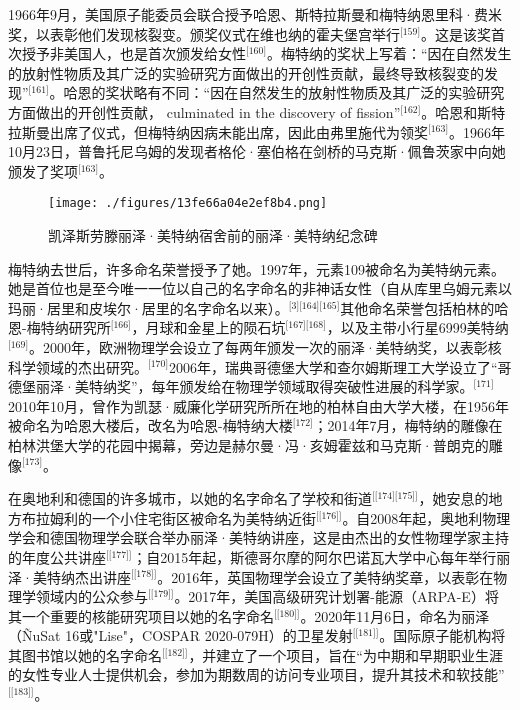 1966年9月，美国原子能委员会联合授予哈恩、斯特拉斯曼和梅特纳恩里科·费米奖，以表彰他们发现核裂变。颁奖仪式在维也纳的霍夫堡宫举行\(^\text{[159]}\)。这是该奖首次授予非美国人，也是首次颁发给女性\(^\text{[160]}\)。梅特纳的奖状上写着：“因在自然发生的放射性物质及其广泛的实验研究方面做出的开创性贡献，最终导致核裂变的发现”\(^\text{[161]}\)。哈恩的奖状略有不同：“因在自然发生的放射性物质及其广泛的实验研究方面做出的开创性贡献， culminated in the discovery of fission”\(^\text{[162]}\)。哈恩和斯特拉斯曼出席了仪式，但梅特纳因病未能出席，因此由弗里施代为领奖\(^\text{[163]}\)。1966年10月23日，普鲁托尼乌姆的发现者格伦·塞伯格在剑桥的马克斯·佩鲁茨家中向她颁发了奖项\(^\text{[163]}\)。
\begin{figure}[ht]
\centering
\texttt{[image: ./figures/13fe66a04e2ef8b4.png]}
\caption{凯泽斯劳滕丽泽·美特纳宿舍前的丽泽·美特纳纪念碑} \label{fig_LZm_17}
\end{figure}
梅特纳去世后，许多命名荣誉授予了她。1997年，元素109被命名为美特纳元素。她是首位也是至今唯一一位以自己的名字命名的非神话女性（自从库里乌姆元素以玛丽·居里和皮埃尔·居里的名字命名以来）。\(^\text{[3][164][165]}\)其他命名荣誉包括柏林的哈恩-梅特纳研究所\(^\text{[166]}\)，月球和金星上的陨石坑\(^\text{[167][168]}\)，以及主带小行星6999美特纳\(^\text{[169]}\)。2000年，欧洲物理学会设立了每两年颁发一次的丽泽·美特纳奖，以表彰核科学领域的杰出研究。\(^\text{[170]}\)2006年，瑞典哥德堡大学和查尔姆斯理工大学设立了“哥德堡丽泽·美特纳奖”，每年颁发给在物理学领域取得突破性进展的科学家。\(^\text{[171]}\)2010年10月，曾作为凯瑟·威廉化学研究所所在地的柏林自由大学大楼，在1956年被命名为哈恩大楼后，改名为哈恩-梅特纳大楼\(^\text{[172]}\)；2014年7月，梅特纳的雕像在柏林洪堡大学的花园中揭幕，旁边是赫尔曼·冯·亥姆霍兹和马克斯·普朗克的雕像\(^\text{[173]}\)。

在奥地利和德国的许多城市，以她的名字命名了学校和街道\(^\text{[[174][175]]}\)，她安息的地方布拉姆利的一个小住宅街区被命名为美特纳近街\(^\text{[[176]]}\)。自2008年起，奥地利物理学会和德国物理学会联合举办丽泽·美特纳讲座，这是由杰出的女性物理学家主持的年度公共讲座\(^\text{[[177]]}\)；自2015年起，斯德哥尔摩的阿尔巴诺瓦大学中心每年举行丽泽·美特纳杰出讲座\(^\text{[[178]]}\)。2016年，英国物理学会设立了美特纳奖章，以表彰在物理学领域内的公众参与\(^\text{[[179]]}\)。2017年，美国高级研究计划署-能源（ARPA-E）将其一个重要的核能研究项目以她的名字命名\(^\text{[[180]]}\)。2020年11月6日，命名为丽泽（ÑuSat 16或"Lise"，COSPAR 2020-079H）的卫星发射\(^\text{[[181]]}\)。国际原子能机构将其图书馆以她的名字命名\(^\text{[[182]]}\)，并建立了一个项目，旨在“为中期和早期职业生涯的女性专业人士提供机会，参加为期数周的访问专业项目，提升其技术和软技能”\(^\text{[[183]]}\)。
